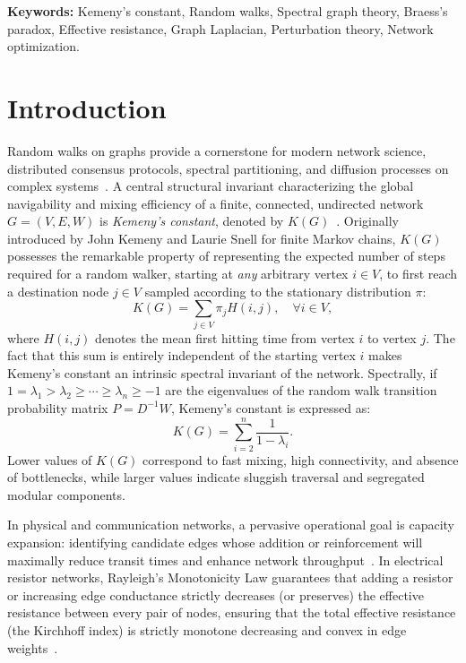 \documentclass[11pt,a4paper]{article}
\theoremstyle{plain}
\theoremstyle{definition}
\begin{document}
\textbf{Keywords:} Kemeny's constant, Random walks, Spectral graph theory, Braess's paradox, Effective resistance, Graph Laplacian, Perturbation theory, Network optimization.

\section{Introduction}
\label{sec:intro}

Random walks on graphs provide a cornerstone for modern network science, distributed consensus protocols, spectral partitioning, and diffusion processes on complex systems~\cite{doyle1984random,spielman2011graph}. A central structural invariant characterizing the global navigability and mixing efficiency of a finite, connected, undirected network $G = (V, E, W)$ is \textit{Kemeny's constant}, denoted by $K(G)$~\cite{kemeny1960finite}. Originally introduced by John Kemeny and Laurie Snell for finite Markov chains, $K(G)$ possesses the remarkable property of representing the expected number of steps required for a random walker, starting at \textit{any} arbitrary vertex $i \in V$, to first reach a destination node $j \in V$ sampled according to the stationary distribution $\pi$:
\begin{equation}
    K(G) = \sum_{j \in V} \pi_j H(i, j), \quad \forall i \in V,
\end{equation}
where $H(i, j)$ denotes the mean first hitting time from vertex $i$ to vertex $j$. The fact that this sum is entirely independent of the starting vertex $i$ makes Kemeny's constant an intrinsic spectral invariant of the network. Spectrally, if $1 = \lambda_1 > \lambda_2 \ge \cdots \ge \lambda_n \ge -1$ are the eigenvalues of the random walk transition probability matrix $P = D^{-1} W$, Kemeny's constant is expressed as:
\begin{equation}
    K(G) = \sum_{i=2}^n \frac{1}{1 - \lambda_i}.
\end{equation}
Lower values of $K(G)$ correspond to fast mixing, high connectivity, and absence of bottlenecks, while larger values indicate sluggish traversal and segregated modular components.

In physical and communication networks, a pervasive operational goal is capacity expansion: identifying candidate edges whose addition or reinforcement will maximally reduce transit times and enhance network throughput~\cite{ghosh2008minimizing}. In electrical resistor networks, Rayleigh's Monotonicity Law guarantees that adding a resistor or increasing edge conductance strictly decreases (or preserves) the effective resistance between every pair of nodes, ensuring that the total effective resistance (the Kirchhoff index) is strictly monotone decreasing and convex in edge weights~\cite{ghosh2008minimizing,klein1993resistance}.
\end{document}
